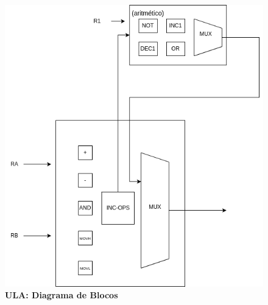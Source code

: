 \documentclass{article}
\begin{document}
    \begin{figure}[h]
      \captionsetup{labelformat=empty, skip=0pt}
      \caption{\textbf{ULA: Diagrama de Blocos}}
      \centering
      \noindent\hspace*{0cm}\includegraphics[scale=0.5]{./datapaths/vetorial/ulaVetorial.png}
    \end{figure}
\end{document}
